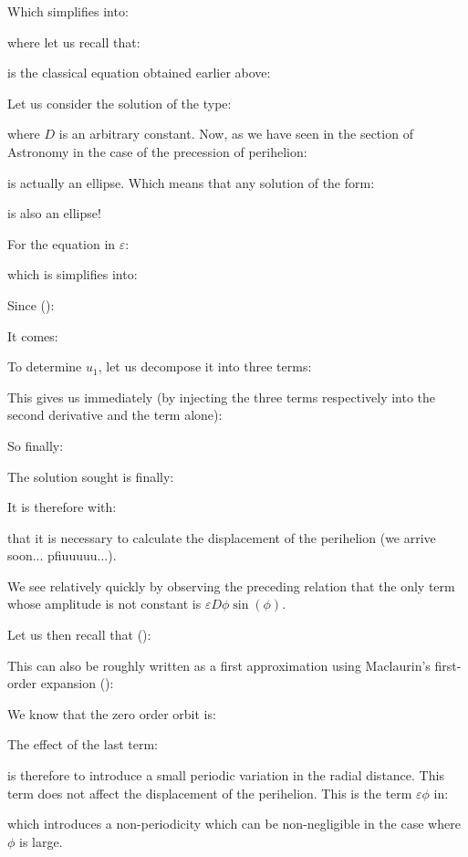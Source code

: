 	Which simplifies into:
	
	where let us recall that:
	
	is the classical equation obtained earlier above:
	
	Let us consider the solution of the type:
	
	where $D$ is an arbitrary constant. Now, as we have seen in the section of Astronomy in the case of the precession of perihelion:
	
	is actually an ellipse. Which means that any solution of the form:
	
	is also an ellipse!
	
	For the equation in $\varepsilon$:
	
	which is simplifies into:
	
	Since ():
	
	It comes:
	
	To determine $u_1$, let us decompose it into three terms:
	
	This gives us immediately (by injecting the three terms respectively into the second derivative and the term alone):
	
	So finally:
	
	The solution sought is finally:
	
	It is therefore with:
	
	that it is necessary to calculate the displacement of the perihelion (we arrive soon... pfiuuuuu...).
	
	We see relatively quickly by observing the preceding relation that the only term whose amplitude is not constant is $\varepsilon D\phi\sin(\phi)$.

	Let us then recall that ():
	
	This can also be roughly written as a first approximation using Maclaurin's first-order expansion ():
	
	We know that the zero order orbit is:
	
	The effect of the last term:
	
	is therefore to introduce a small periodic variation in the radial distance. This term does not affect the displacement of the perihelion. This is the term $\varepsilon\phi$ in:
	
	which introduces a non-periodicity which can be non-negligible in the case where $\phi$ is large.
	
